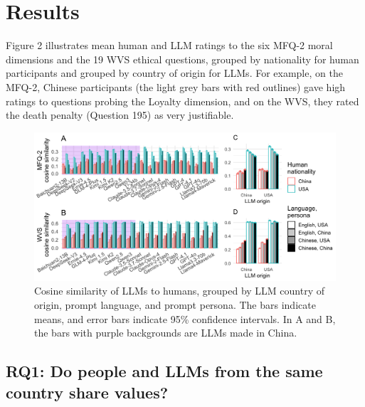 \documentclass[11pt,a4paper]{article}
\begin{document}
\section{Results}

Figure 2 illustrates mean human and LLM ratings to the six MFQ-2 moral dimensions and the 19 WVS ethical questions, grouped by nationality for human participants and grouped by country of origin for LLMs. For example, on the MFQ-2, Chinese participants (the light grey bars with red outlines) gave high ratings to questions probing the Loyalty dimension, and on the WVS, they rated the death penalty (Question 195) as very justifiable.

\begin{figure}
    \centering
    \includegraphics[width=1\linewidth]{fig4.png}
    \caption{Cosine similarity of LLMs to humans, grouped by LLM country of origin, prompt language, and prompt persona. The bars indicate means, and error bars indicate 95\% confidence intervals. In A and B, the bars with purple backgrounds are LLMs made in China.}
    \label{fig:placeholder}
\end{figure}

\subsection{RQ1: Do people and LLMs from the same country share values?}
\end{document}
